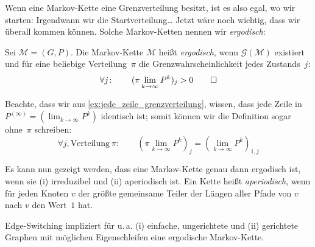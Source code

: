 Wenn eine Markov-Kette eine Grenzverteilung besitzt, ist es also egal, wo wir starten:
Irgendwann  wir die Startverteilung\dots{}
Jetzt wäre noch wichtig, dass wir überall  kommen können.
Solche Markov-Ketten nennen wir \emph{ergodisch}:

\begin{definition}
Sei $\mathcal M = (G, P)$.
Die Markov-Kette $\mathcal M$ heißt \emph{ergodisch}, wenn $\mathcal G(\mathcal M)$ existiert und für eine beliebige Verteilung~$\pi$ die Grenzwahrscheinlichkeit jedes Zustands~$j$:
\begin{equation*}
    \forall j\colon \qquad (\pi \lim_{k \to \infty} P^k)_{j} > 0 \hfill \qedhere
\end{equation*}
\end{definition}

Beachte, dass wir aus \cref{ex:jede_zeile_grenzverteilung}, wissen, dass jede Zeile in $P^{(\infty)} = (\lim_{k \to \infty} P^k)$ identisch ist; somit können wir die Definition sogar ohne~$\pi$ schreiben:
\begin{equation}
    \forall j, \text{Verteilung}~\pi\colon\qquad (\pi \lim_{k \to \infty} P^k)_{j} = (\lim_{k \to \infty} P^k)_{1,j}
\end{equation}

\bigskip

Es kann nun gezeigt werden, dass eine Markov-Kette genau dann ergodisch ist, wenn sie (i) irreduzibel und (ii) aperiodisch ist.
Ein Kette heißt \emph{aperiodisch}, wenn für jeden Knoten $v$ der größte gemeinsame Teiler der Längen aller Pfade von $v$ nach $v$ den Wert~$1$ hat.

\begin{theorem}
    Edge-Switching impliziert für u.\,a. (i) einfache, ungerichtete und (ii) gerichtete Graphen mit möglichen Eigenschleifen eine ergodische Markov-Kette.
\end{theorem}

